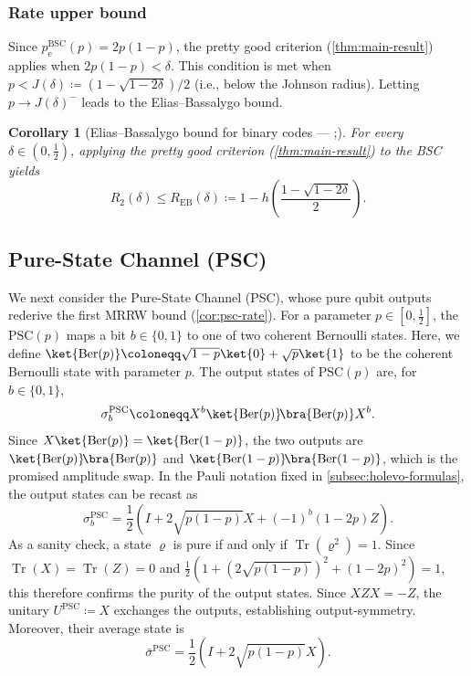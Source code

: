 \documentclass[11pt]{article}
\renewcommand{\leq}{\leqslant}
\newtheorem{corollary}[corollary]{Corollary}
\theoremstyle{remark}
\newcommand{\ketbra}[2]{\ket{#1}\!\bra{#2}}
\newcommand{\Ber}{\operatorname{Ber}}
\newcommand{\Tr}{\operatorname{Tr}}
\newcommand{\bits}{\{0,1\}}
\newcommand{\BSC}{\mathrm{BSC}}
\newcommand{\PSC}{\mathrm{PSC}}
\begin{document}
\subsubsection{Rate upper bound}
\label{subsubsec:bsc-rate}

Since $p_{\mathrm{e}}^{\BSC}(p) = 2p(1-p)$, the pretty good criterion (\cref{thm:main-result}) applies when $2p(1-p) < \delta$. This condition is met when $p < J(\delta) \coloneqq (1-\sqrt{1-2\delta})/2$ (i.e., below the Johnson radius). Letting $p \to J(\delta)^-$ leads to the Elias--Bassalygo bound.

\begin{corollary}[{Elias--Bassalygo bound for binary codes --- \cite[Appendix A, Equations~(A.15)--(A.18)]{Eli55};\cite[Equations~(5)~and~(8)]{Bas65}}]
\label{cor:bsc-rate}
For every $\delta \in (0,\frac{1}{2})$, applying the pretty good criterion (\cref{thm:main-result}) to the BSC yields
\begin{equation*}
R_2(\delta) \leq R_{\mathrm{EB}}(\delta) \coloneqq 1-h\left(\frac{1-\sqrt{1-2\delta}}{2}\right).
\end{equation*}
\end{corollary}

\subsection{Pure-State Channel (PSC)}
\label{subsec:psc}

We next consider the Pure-State Channel (PSC), whose pure qubit outputs rederive the first MRRW bound (\cref{cor:psc-rate}). For a parameter $p \in [0,\frac{1}{2}]$, the $\PSC(p)$ maps a bit $b \in \bits$ to one of two coherent Bernoulli states. Here, we define $\ket{\Ber(p)} \coloneqq \sqrt{1-p}\ket{0}+\sqrt{p}\ket{1}$ to be the coherent Bernoulli state with parameter $p$. The output states of $\PSC(p)$ are, for $b \in \bits$,
\begin{equation*}
\sigma_b^{\PSC} \coloneqq X^b\ketbra{\Ber(p)}{\Ber(p)}X^b.
\end{equation*}
Since $X\ket{\Ber(p)} = \ket{\Ber(1-p)}$, the two outputs are $\ketbra{\Ber(p)}{\Ber(p)}$ and $\ketbra{\Ber(1-p)}{\Ber(1-p)}$, which is the promised amplitude swap.
In the Pauli notation fixed in \cref{subsec:holevo-formulas}, the output states can be recast as
\begin{equation}
\label{eq:psc-pauli-form}
\sigma_b^{\PSC} = \frac{1}{2}\left(I+2\sqrt{p(1-p)}X+(-1)^b(1-2p)Z\right).
\end{equation}
As a sanity check, a state $\varrho$ is pure if and only if $\Tr(\varrho^2) = 1$. Since $\Tr(X) = \Tr(Z) = 0$ and $\frac{1}{2}(1+(2\sqrt{p(1-p)})^2+(1-2p)^2) = 1$, this therefore confirms the purity of the output states. Since $XZX = -Z$, the unitary $U^{\PSC} \coloneqq X$ exchanges the outputs, establishing output-symmetry. Moreover, their average state is
\begin{equation}
\label{eq:psc-average-state}
\bar{\sigma}^{\PSC} = \frac{1}{2}\left(I+2\sqrt{p(1-p)}X\right).
\end{equation}
\end{document}
